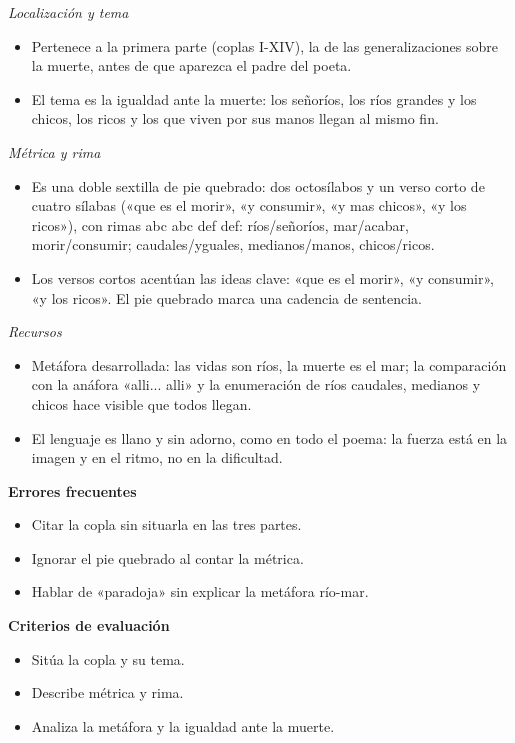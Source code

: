\documentclass{book}
\begin{document}
\begin{tcolorbox}[title={Ejercicio resuelto}, studiumworked, breakable]
\noindent\textit{Localización y tema}
\begin{itemize}
\item Pertenece a la primera parte (coplas I-XIV), la de las generalizaciones sobre la muerte, antes de que aparezca el padre del poeta.
\item El tema es la igualdad ante la muerte: los señoríos, los ríos grandes y los chicos, los ricos y los que viven por sus manos llegan al mismo fin.
\end{itemize}

\noindent\textit{Métrica y rima}
\begin{itemize}
\item Es una doble sextilla de pie quebrado: dos octosílabos y un verso corto de cuatro sílabas («que es el morir», «y consumir», «y mas chicos», «y los ricos»), con rimas abc abc def def: ríos/señoríos, mar/acabar, morir/consumir; caudales/yguales, medianos/manos, chicos/ricos.
\item Los versos cortos acentúan las ideas clave: «que es el morir», «y consumir», «y los ricos». El pie quebrado marca una cadencia de sentencia.
\end{itemize}

\noindent\textit{Recursos}
\begin{itemize}
\item Metáfora desarrollada: las vidas son ríos, la muerte es el mar; la comparación con la anáfora «alli... alli» y la enumeración de ríos caudales, medianos y chicos hace visible que todos llegan.
\item El lenguaje es llano y sin adorno, como en todo el poema: la fuerza está en la imagen y en el ritmo, no en la dificultad.
\end{itemize}

\noindent\textbf{Errores frecuentes}
\begin{itemize}
\item Citar la copla sin situarla en las tres partes.
\item Ignorar el pie quebrado al contar la métrica.
\item Hablar de «paradoja» sin explicar la metáfora río-mar.
\end{itemize}

\noindent\textbf{Criterios de evaluación}
\begin{itemize}
\item Sitúa la copla y su tema.
\item Describe métrica y rima.
\item Analiza la metáfora y la igualdad ante la muerte.
\end{itemize}
\end{tcolorbox}
\end{document}
